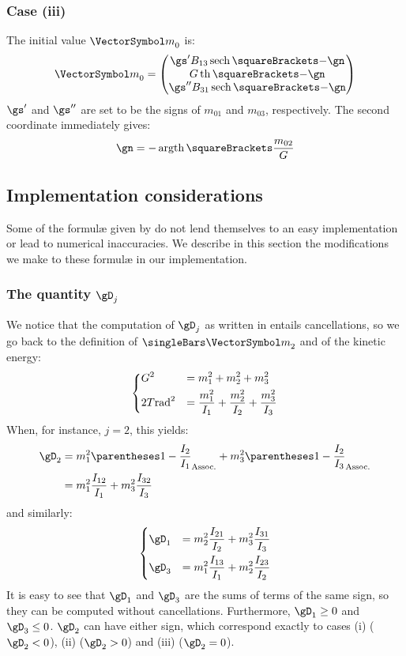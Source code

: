 \documentclass[10pt, a4paper, twoside]{basestyle}
\begin{document}
\subsubsection*{Case (iii)}
The initial value ${\vm}_0$  is:
\[
{\vm}_0 =
\begin{pmatrix}
\gs' B_{13} \HyperbolicSecant\of{-\gn} \\
G \HyperbolicTangent\of{-\gn} \\
\gs'' B_{31} \HyperbolicSecant\of{-\gn}
\end{pmatrix}
\]
$\gs'$ and $\gs''$ are set to be the signs of $m_{01}$ and $m_{03}$, respectively.  The second coordinate immediately gives:
\[
\gn = -\InverseHyperbolicTangent\of{\frac{m_{02}}{G}}
\]

\subsection*{Implementation considerations}
Some of the formulæ given by \cite{Celledoni2007} do not lend themselves to an easy implementation or lead to numerical inaccuracies.  We
describe in this section the modifications we make to these formulæ in our implementation.

\subsubsection*{The quantity $\gD_j$}
We notice that the computation of $\gD_j$ as written in \cite{Celledoni2007} entails cancellations, so we go back to the definition of $\norm{\vm}$ and of the kinetic energy:
\[
\begin{dcases}
G^2 &= m_1^2 + m_2^2 + m_3^2 \\
2 T \si{\raiseto{2}\radian} &= \frac{m_1^2}{I_1} + \frac{m_2^2}{I_2} + \frac{m_3^2}{I_3}
\end{dcases}
\]
When, for instance, $j = 2$, this yields:
\begin{align*}
\gD_2 &= m_1^2 \pa{1 - \frac{I_2}{I_1}} + m_3^2 \pa{1 - \frac{I_2}{I_3}} \\
&= m_1^2 \frac{I_{12}}{I_1} + m_3^2 \frac{I_{32}}{I_3}
\end{align*}
and similarly:
\[
\begin{dcases}
\gD_1 &= m_2^2 \frac{I_{21}}{I_2} + m_3^2 \frac{I_{31}}{I_3} \\
\gD_3 &= m_1^2 \frac{I_{13}}{I_1} + m_2^2 \frac{I_{23}}{I_2}
\end{dcases}
\]
It is easy to see that $\gD_1$ and $\gD_3$ are the sums of terms of the same sign, so they can be computed without cancellations.  Furthermore,
$\gD_1 \geq 0$ and $\gD_3 \leq 0$.  $\gD_2$ can have either sign, which correspond exactly to cases (i) ($\gD_2 < 0$), (ii) ($\gD_2 > 0$) and 
(iii) ($\gD_2 = 0$).
\end{document}
